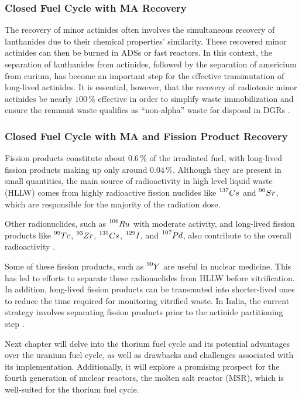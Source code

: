 \subsubsection{Closed Fuel Cycle with MA Recovery}

The recovery of minor actinides often involves the simultaneous recovery of lanthanides due to their chemical properties' similarity. These recovered minor actinides can then be burned in ADSs or fast reactors. In this context, the separation of lanthanides from actinides, followed by the separation of americium from curium, has become an important step for the effective transmutation of long-lived actinides. It is essential, however, that the recovery of radiotoxic minor actinides be nearly \(100 \, \%\) effective in order to simplify waste immobilization and ensure the remnant waste qualifies as ``non-alpha'' waste for disposal in DGRs \cite{fuel_cycle_book}.

\subsubsection{Closed Fuel Cycle with MA and Fission Product Recovery}

Fission products constitute about \(0.6 \, \%\) of the irradiated fuel, with long-lived fission products making up only around \(0.04 \, \%\). Although they are present in small quantities, the main source of radioactivity in high level liquid waste (HLLW) comes from highly radioactive fission nuclides like \(\prescript{137}{}{Cs}\) and \(\prescript{90}{}{Sr}\), which are responsible for the majority of the radiation dose. 

Other radionuclides, such as \(\prescript{106}{}{Ru}\) with moderate activity, and long-lived fission products like \(\prescript{99}{}{Tc}\), \(\prescript{93}{}{Zr}\), \(\prescript{135}{}{Cs}\), \(\prescript{129}{}{I}\), and \(\prescript{107}{}{Pd}\), also contribute to the overall radioactivity \cite{fuel_cycle_book}.

Some of these fission products, such as \(\prescript{90}{}{Y}\) are useful in nuclear medicine. This has led to efforts to separate these radionuclides from HLLW before vitrification. In addition, long-lived fission products can be transmuted into shorter-lived ones to reduce the time required for monitoring vitrified waste. In India, the current strategy involves separating fission products prior to the actinide partitioning step \cite{fuel_cycle_book}.

Next chapter will delve into the thorium fuel cycle and its potential advantages over the uranium fuel cycle, as well as drawbacks and challenges associated with its implementation. Additionally, it will explore a promising prospect for the fourth generation of nuclear reactors, the molten salt reactor (MSR), which is well-suited for the thorium fuel cycle.
